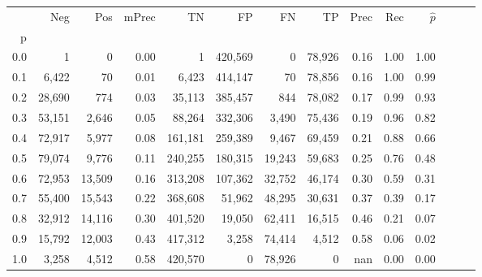 \begin{tabular}{rrrrrrrrrrrrrr}
\toprule
{} &     Neg &     Pos & mPrec &       TN &       FP &      FN &      TP &  Prec &   Rec & $\hat{p}$ \\
p   &         &         &       &          &          &         &         &       &       &           \\
\midrule
0.0 &       1 &       0 &  0.00 &        1 &  420,569 &       0 &  78,926 &  0.16 &  1.00 &      1.00 \\
0.1 &   6,422 &      70 &  0.01 &    6,423 &  414,147 &      70 &  78,856 &  0.16 &  1.00 &      0.99 \\
0.2 &  28,690 &     774 &  0.03 &   35,113 &  385,457 &     844 &  78,082 &  0.17 &  0.99 &      0.93 \\
0.3 &  53,151 &   2,646 &  0.05 &   88,264 &  332,306 &   3,490 &  75,436 &  0.19 &  0.96 &      0.82 \\
0.4 &  72,917 &   5,977 &  0.08 &  161,181 &  259,389 &   9,467 &  69,459 &  0.21 &  0.88 &      0.66 \\
0.5 &  79,074 &   9,776 &  0.11 &  240,255 &  180,315 &  19,243 &  59,683 &  0.25 &  0.76 &      0.48 \\
0.6 &  72,953 &  13,509 &  0.16 &  313,208 &  107,362 &  32,752 &  46,174 &  0.30 &  0.59 &      0.31 \\
0.7 &  55,400 &  15,543 &  0.22 &  368,608 &   51,962 &  48,295 &  30,631 &  0.37 &  0.39 &      0.17 \\
0.8 &  32,912 &  14,116 &  0.30 &  401,520 &   19,050 &  62,411 &  16,515 &  0.46 &  0.21 &      0.07 \\
0.9 &  15,792 &  12,003 &  0.43 &  417,312 &    3,258 &  74,414 &   4,512 &  0.58 &  0.06 &      0.02 \\
1.0 &   3,258 &   4,512 &  0.58 &  420,570 &        0 &  78,926 &       0 &   nan &  0.00 &      0.00 \\
\bottomrule
\end{tabular}
